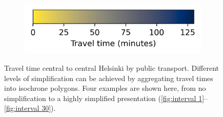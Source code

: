\begin{figure}[H]
\begin{subfigure}[b]{0.4\textwidth}
		\includegraphics[width=\textwidth]{visual/figures/ttm/isochrone_cbar}
	\end{subfigure}%
	\caption{
		Travel time central to central Helsinki by public transport.
		Different levels of simplification can be achieved by
		aggregating travel times into isochrone polygons.
		Four examples are shown here, from no simplification
		to a highly simplified presentation
		(\ref{fig:interval 1}--\ref{fig:interval 30}).
	}
	\label{fig:isochrone intervals}
\end{figure}

